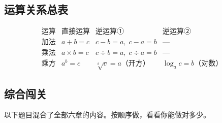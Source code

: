 \subsection*{运算关系总表}

\[
\begin{array}{c|c|c|c}
\text{运算} & \text{直接运算} & \text{逆运算①} & \text{逆运算②} \\ \hline
\text{加法} & a+b=c & c-b=a,\;c-a=b & — \\
\text{乘法} & a\times b=c & c\div b=a,\;c\div a=b & — \\
\text{乘方} & a^b=c & \sqrt[b]{c}=a\text{（开方）} & \log_a c=b\text{（对数）}
\end{array}
\]

\subsection*{综合闯关}

以下题目混合了全部六章的内容。按顺序做，看看你能做对多少。

